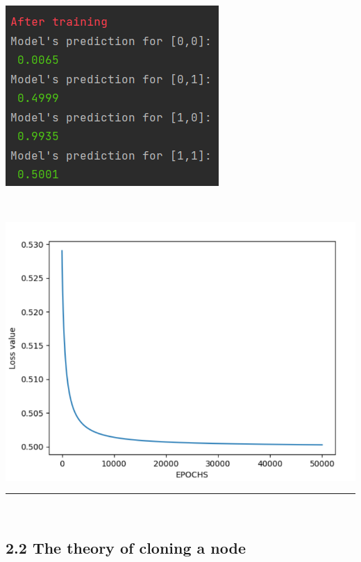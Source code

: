 \documentclass[12pt,english,]{article}
\let\origfigure\figure
\let\endorigfigure\endfigure
\renewenvironment{figure}[1][2] {
    \expandafter\origfigure\expandafter[H]
} {
    \endorigfigure
}
\begin{document}
\begin{figure}

{\centering \includegraphics[width=0.7\linewidth]{images/50k_pred} 

}

\caption{\label{fig2:figs}The predictions of the model after $50 000$ epochs.}\label{fig:unnamed-chunk-2}
\end{figure}

~

\begin{figure}

{\centering \includegraphics[width=0.7\linewidth]{images/50k_graph} 

}

\caption{\label{fig3:figs}The graph of cost function after $50 000$ epochs.}\label{fig:unnamed-chunk-3}
\end{figure}

\hrule

~
 
\hypertarget{section2.2}{%
\subsection{\texorpdfstring{2.2 \enspace The theory of cloning a node}{2.2 The theory of cloning a node}}\label{section2.2}}
\end{document}
